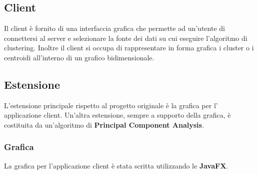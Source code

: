 \documentclass{article}
\begin{document}
	\subsection{Client}
	Il client è fornito di una interfaccia grafica che permette ad un'utente
	di connettersi al server e selezionare la fonte dei dati su cui eseguire
	l'algoritmo di clustering. Inoltre il client si occupa di rappresentare
	in forma grafica i cluster o i centroidi all'interno di un grafico
	bidimensionale.

	\subsection{Estensione}
	L'estensione principale rispetto al progetto originale è la grafica per
	l' applicazione client. Un'altra estensione, sempre a supporto della
	grafica, è costituita da un'algoritmo di \textbf{Principal Component
	Analysis}.

	\subsubsection{Grafica}
	La grafica per l'applicazione client è stata scritta utilizzando le
	\textbf{JavaFX}.
\end{document}
